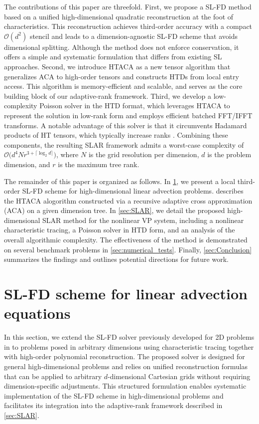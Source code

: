 \documentclass{article}
\theoremstyle{plain}
\theoremstyle{definition}
\theoremstyle{remark}
\begin{document}
The contributions of this paper are threefold. First, we propose a SL-FD method based on a unified high-dimensional quadratic reconstruction at the foot of characteristics. This reconstruction achieves third-order accuracy with a compact $\mathcal{O}(d^{2})$ stencil and leads to a dimension-agnostic SL-FD scheme that avoids dimensional splitting. Although the method does not enforce conservation, it offers a simple and systematic formulation that differs from existing SL approaches. Second, we introduce HTACA as a new tensor algorithm that generalizes ACA to high-order tensors and constructs HTDs from local entry access. This algorithm is memory-efficient and scalable, and serves as the core building block of our adaptive-rank framework. Third, we develop a low-complexity Poisson solver in the HTD format, which leverages HTACA to represent the solution in low-rank form and employs efficient batched FFT/IFFT transforms. A notable advantage of this solver is that it circumvents Hadamard products of HT tensors, which typically increase ranks \cite{kressner2012htucker}. Combining these components, the resulting SLAR framework admits a worst-case complexity of $\mathcal{O}\!\bigl(d^{4} N r^{3+\lceil \log_{2} d \rceil}\bigr)$, where $N$ is the grid resolution per dimension, $d$ is the problem dimension, and $r$ is the maximum tree rank.

The remainder of this paper is organized as follows. 
In \cref{sec:SL-FD-high-D}, we present a local third-order SL-FD scheme for high-dimensional linear advection problems. 
 describes the HTACA alogorithm constructed via a recursive adaptive cross approximation (ACA) on a given dimension tree. In \cref{sec:SLAR}, we detail the proposed high-dimensional SLAR method for the nonlinear VP system, including a nonlinear characteristic tracing, a Poisson solver in HTD form, and an analysis of the overall algorithmic complexity. The effectiveness of the method is demonstrated on several benchmark problems in \cref{sec:numerical_tests}. Finally, \cref{sec:Conclusion} summarizes the findings and outlines potential directions for future work. 

\section{SL-FD scheme for linear advection equations}
\label{sec:SL-FD-high-D}

In this section, we extend the SL-FD solver previously developed for 2D problems in \cite{zheng2025semi} to problems posed in arbitrary dimensions using characteristic tracing together with high-order polynomial reconstruction. The proposed solver is designed for general high-dimensional problems and relies on unified reconstruction formulas that can be applied to arbitrary $d$-dimensional Cartesian grids without requiring dimension-specific adjustments. This structured formulation enables systematic implementation of the SL-FD scheme in high-dimensional problems and facilitates its integration into the adaptive-rank framework described in \cref{sec:SLAR}.
\end{document}
